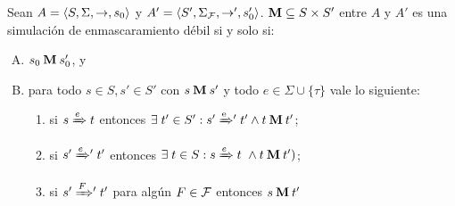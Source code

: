 \begin{theorem} \label{thm:weak_thm}
  Sean
$A =\langle S, \Sigma, \rightarrow, s_0 \rangle$ y $A' =\langle S', \Sigma_{\mathcal{F}}, \rightarrow', s'_0 \rangle$. 
$\mathbin{\mathbf{M}} \subseteq S \times S'$ entre $A$ y $A'$ es una simulación de enmascaramiento débil si y solo si:

\begin{enumerate}[(A)]
  \item $s_0 \mathbin{\mathbf{M}} s'_0$, y
  \item para todo $s \in S, s' \in S'$ con $s \mathbin{\mathbf{M}} s'$ y todo $e \in \Sigma \cup \{\tau\}$ vale lo siguiente:

  \begin{enumerate}[(1)]
    \item si $s \xRightarrow{e} t$ entonces $\exists\; t' \in S': s' \mathrel{{\xRightarrow[]{\text{e}}}{}'} t' 
    \wedge t \mathbin{\mathbf{M}} t'$;

      \item si $s' \mathrel{{\xRightarrow[]{e}}{}'} t'$ entonces 
      $\exists \; t \in S: s \xRightarrow{e} t \
      \wedge t \mathbin{\mathbf{M}} t')$;

      \item si $s' \mathrel{{\xRightarrow[]{F}}{}'} t'$ para algún $F \in \mathcal{F}$ entonces 
      $s \mathbin{\mathbf{M}} t'$
  \end{enumerate}
\end{enumerate}

\end{theorem}

